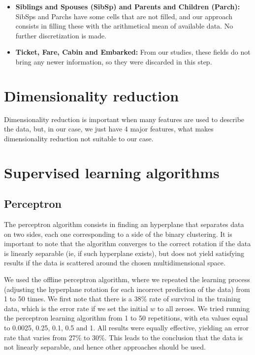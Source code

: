 \documentclass[12pt,a4paper]{article}
\begin{document}
\begin{itemize}
\item \textbf{Siblings and Spouses (SibSp) and Parents and Children (Parch):} SibSps and Parchs have some cells that are not filled, and our approach consists in filling these with the arithmetical mean of available data. No further discretization is made.

\item \textbf{Ticket, Fare, Cabin and Embarked:} From our studies, these fields do not bring any newer information, so they were discarded in this step.
\end{itemize}

\section{Dimensionality reduction}
Dimensionality reduction is important when many features are used to describe the data, but, in our case, we just have 4 major features, what makes dimensionality reduction not suitable to our case.

\section{Supervised learning algorithms} 

\subsection{Perceptron} 
The perceptron algorithm consists in finding an hyperplane that separates data on two sides, each one corresponding to a side of the binary clustering. It is important to note that the algorithm converges to the correct rotation if the data is linearly separable (ie, if such hyperplane exists), but does not yield satisfying results if the data is scattered around the chosen multidimensional space. 

We used the offline perceptron algorithm, where we repeated the learning process (adjusting the hyperplane rotation for each incorrect prediction of the data) from 1 to 50 times. We first note that there is a 38\% rate of survival in the training data, which is the error rate if we set the initial $w$ to all zeroes. We tried running the perceptron learning algorithm from 1 to 50 repetitions, with eta values equal to 0.0025, 0.25, 0.1, 0.5 and 1. All results were equally effective, yielding an error rate that varies from 27\% to 30\%. This leads to the conclusion that the data is not linearly separable, and hence other approaches should be used. 
\end{document}
